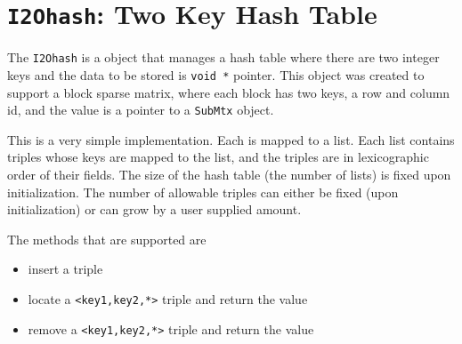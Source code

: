 \chapter{{\tt I2Ohash}: 
Two Key Hash Table}
\par
The {\tt I2Ohash} is a object that manages a hash table
where there are two integer keys and the data to be stored 
is {\tt void *} pointer.
This object was created to support a block sparse matrix, where
each block has two keys, a row and column id, and the value is a
pointer to a {\tt SubMtx} object.
\par
This is a very simple implementation.
Each {\tt <key1,key2>} is mapped to a list.
Each list contains {\tt <key1,key2,value>} triples 
whose keys are mapped to the list, 
and the triples are in lexicographic order 
of their {\tt <key1,key2>} fields.
The size of the hash table (the number of lists)
is fixed upon initialization.
The number of allowable {\tt <key1,key2,value>} triples 
can either be fixed (upon initialization) 
or can grow by a user supplied amount.
\par
The methods that are supported are
\begin{itemize}
\item insert a {\tt <key1,key2,value>} triple
\item locate a {\tt <key1,key2,*>} triple and return the value
\item remove a {\tt <key1,key2,*>} triple and return the value
\end{itemize}
